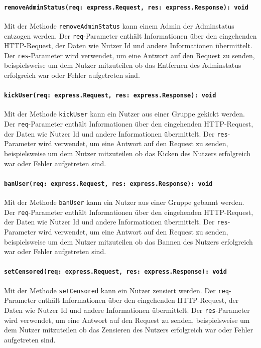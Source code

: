 \documentclass{entwurfsheft}
\begin{document}
\paragraph{\texttt{removeAdminStatus(req: express.Request, res: express.Response): void}}
Mit der Methode \texttt{removeAdminStatus} kann einem Admin der Adminstatus entzogen werden. Der \texttt{req}-Parameter enthält Informationen über den eingehenden HTTP-Request, der Daten wie Nutzer Id und andere Informationen übermittelt. Der \texttt{res}-Parameter wird verwendet, um eine Antwort auf den Request zu senden, beispielsweise um dem Nutzer mitzuteilen ob das Entfernen des Adminstatus erfolgreich war oder Fehler aufgetreten sind.
\paragraph{\texttt{kickUser(req: express.Request, res: express.Response): void}}
Mit der Methode \texttt{kickUser} kann ein Nutzer aus einer Gruppe gekickt werden. Der \texttt{req}-Parameter enthält Informationen über den eingehenden HTTP-Request, der Daten wie Nutzer Id und andere Informationen übermittelt. Der \texttt{res}-Parameter wird verwendet, um eine Antwort auf den Request zu senden, beispielsweise um dem Nutzer mitzuteilen ob das Kicken des Nutzers erfolgreich war oder Fehler aufgetreten sind.
\paragraph{\texttt{banUser(req: express.Request, res: express.Response): void}}
Mit der Methode \texttt{banUser} kann ein Nutzer aus einer Gruppe gebannt werden. Der \texttt{req}-Parameter enthält Informationen über den eingehenden HTTP-Request, der Daten wie Nutzer Id und andere Informationen übermittelt. Der \texttt{res}-Parameter wird verwendet, um eine Antwort auf den Request zu senden, beispielsweise um dem Nutzer mitzuteilen ob das Bannen des Nutzers erfolgreich war oder Fehler aufgetreten sind.
\paragraph{\texttt{setCensored(req: express.Request, res: express.Response): void}}
Mit der Methode \texttt{setCensored} kann ein Nutzer zensiert werden. Der \texttt{req}-Parameter enthält Informationen über den eingehenden HTTP-Request, der Daten wie Nutzer Id und andere Informationen übermittelt. Der \texttt{res}-Parameter wird verwendet, um eine Antwort auf den Request zu senden, beispielsweise um dem Nutzer mitzuteilen ob das Zensieren des Nutzers erfolgreich war oder Fehler aufgetreten sind.
\end{document}
